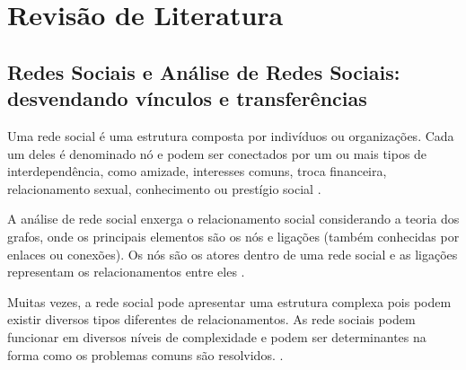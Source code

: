 \chapter{Revisão de Literatura}
\label{sec:revisao}

\section{Redes Sociais e Análise de Redes Sociais: desvendando vínculos e transferências}



Uma rede social é uma estrutura composta por indivíduos ou organizações. Cada um deles é denominado nó e podem ser conectados por um ou mais tipos de interdependência, como amizade, interesses comuns, troca financeira, relacionamento sexual, conhecimento ou prestígio social \cite{kadushin2005benefits}.


A análise de rede social enxerga o relacionamento social considerando a teoria dos grafos, onde os principais elementos são os nós e ligações (também conhecidas por enlaces ou conexões). Os nós são os atores dentro de uma rede social e as ligações representam os relacionamentos entre eles \cite{kadushin2005benefits}.

Muitas vezes, a rede social pode apresentar uma estrutura complexa pois podem existir diversos tipos diferentes de relacionamentos. As rede sociais podem funcionar em diversos níveis de complexidade e podem ser determinantes na forma como os problemas comuns são resolvidos. \cite{stanley1994social}.

